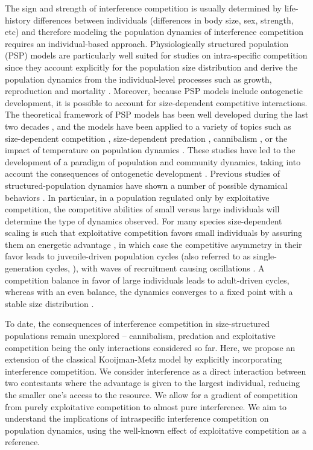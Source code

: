 The sign and strength of interference competition is usually determined by
life-history differences between individuals (differences in body size, sex,
strength, etc) and therefore modeling the population dynamics of interference
competition requires an individual-based approach. Physiologically structured
population (PSP) models are particularly well suited for studies on
intra-specific competition since they account explicitly for the population size
distribution and derive the population dynamics from the individual-level
processes such as growth, reproduction and mortality
\autocite{kooijman1984a,metz1986a,de-roos1997a}. Moreover, because PSP models
include ontogenetic development, it is possible to account for size-dependent
competitive interactions. The theoretical framework of PSP models has been well
developed during the last two decades
\autocite{de-roos1992a,de-roos1997a,persson1998a,de-roos2001a,diekmann2001a,
diekmann2007a,de-roos2012a}, and the models have been applied to a variety of
topics such as size-dependent competition \autocite{persson1998a},
size-dependent predation \autocite{wolfshaar2006a}, cannibalism
\autocite{claessen2000a,claessen2004a}, or the impact of temperature on
population dynamics \autocite{ohlberger2011a}.
These studies have led to the development of a paradigm of population and
community dynamics, taking into account the consequences of ontogenetic
development \autocite{de-roos2012a}. Previous studies of structured-population
dynamics have shown a number of possible dynamical behaviors
\autocite{de-roos2003a,de-roos2003b}. In particular, in a population regulated
only by exploitative competition, the competitive abilities of small versus
large individuals will determine the type of dynamics observed. For many species
size-dependent scaling is such that exploitative competition favors small
individuals by assuring them an energetic advantage
\autocite{persson1998a,persson2006a}, in which case the competitive asymmetry in
their favor leads to juvenile-driven population cycles (also referred to as
single-generation cycles, \textcite{murdoch2002a}), with waves of recruitment
causing oscillations \autocite{de-roos2003a,de-roos2003b}. A competition balance
in favor of large individuals leads to adult-driven cycles, whereas with an even
balance, the dynamics converges to a fixed point with a stable size distribution
\autocite{de-roos2003a,de-roos2003b}.

To date, the consequences of interference competition in size-structured
populations remain unexplored – cannibalism, predation and exploitative
competition being the only interactions considered so far. Here, we propose an
extension of the classical Kooijman-Metz model
\autocite{kooijman1984a,de-roos1997a} by explicitly incorporating interference
competition. We consider interference as a direct interaction between two
contestants where the advantage is given to the largest individual, reducing the
smaller one's access to the resource. We allow for a gradient of competition
from purely exploitative competition to almost pure interference. We aim to
understand the implications of intraspecific interference competition on
population dynamics, using the well-known effect of exploitative competition as
a reference.

